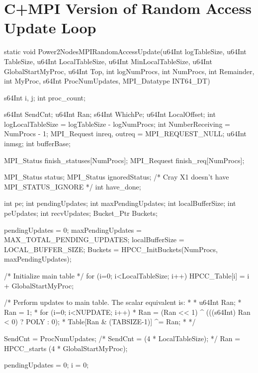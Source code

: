 \appendix

\section{C+MPI Version of Random Access Update Loop}\label{randmpi}
\begin{C}
static void
Power2NodesMPIRandomAccessUpdate(u64Int logTableSize,
                                 u64Int TableSize,
                                 u64Int LocalTableSize,
                                 u64Int MinLocalTableSize,
                                 u64Int GlobalStartMyProc,
                                 u64Int Top,
                                 int logNumProcs,
                                 int NumProcs,
                                 int Remainder,
                                 int MyProc,
                                 s64Int ProcNumUpdates,
                                 MPI_Datatype INT64_DT)
{
  s64Int i, j;
  int proc_count;

  s64Int SendCnt;
  u64Int Ran;
  s64Int WhichPe;
  u64Int LocalOffset;
  int logLocalTableSize = logTableSize - logNumProcs;
  int NumberReceiving = NumProcs - 1;
  MPI_Request inreq, outreq = MPI_REQUEST_NULL;
  u64Int inmsg;
  int bufferBase;

  MPI_Status finish_statuses[NumProcs];
  MPI_Request finish_req[NumProcs];

  MPI_Status status;
  MPI_Status ignoredStatus; /* Cray X1 doesn't have MPI_STATUS_IGNORE */
  int have_done;

  int pe;
  int pendingUpdates;
  int maxPendingUpdates;
  int localBufferSize;
  int peUpdates;
  int recvUpdates;
  Bucket_Ptr Buckets;

  pendingUpdates = 0;
  maxPendingUpdates = MAX_TOTAL_PENDING_UPDATES;
  localBufferSize = LOCAL_BUFFER_SIZE;
  Buckets = HPCC_InitBuckets(NumProcs, maxPendingUpdates);

  /* Initialize main table */
  for (i=0; i<LocalTableSize; i++)
    HPCC_Table[i] = i + GlobalStartMyProc;

  /* Perform updates to main table.  The scalar equivalent is:
   *
   *     u64Int Ran;
   *     Ran = 1;
   *     for (i=0; i<NUPDATE; i++) {
   *       Ran = (Ran << 1) ^ (((s64Int) Ran < 0) ? POLY : 0);
   *       Table[Ran & (TABSIZE-1)] ^= Ran;
   *     }
   */

  SendCnt = ProcNumUpdates; /*  SendCnt = (4 * LocalTableSize); */
  Ran = HPCC_starts (4 * GlobalStartMyProc);

  pendingUpdates = 0;
  i = 0;

}
\end{C}
